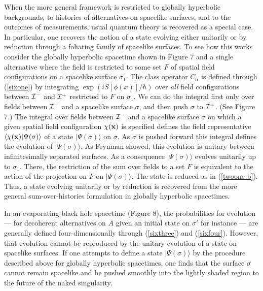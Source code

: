 When the more general framework is restricted to globally hyperbolic
backgrounds, to histories of alternatives on spacelike surfaces, and
to the outcomes of measurements, usual quantum theory is recovered as a special
case.  In particular, one recovers the notion of a state evolving either
unitarily or by reduction through a foliating family of spacelike
surfaces.  To see how this works consider the globally hyperbolic 
spacetime shown in Figure 7 and  a single
alternative where the field is restricted to some set $F$ of spatial
field configurations on a spacelike surface $\sigma_1$. The class
operator $C_\alpha$ is defined through
(\ref{sixone})  by integrating
$\exp(iS [\phi(x)]/\hbar)$ over {\it all} field configurations
between
${\cal I}^-$ and
${\cal I}^+$ restricted to $F$ on $\sigma_1$. We can
do the integral first only over fields between ${\cal I}^-$ and
a spacelike surface
$\sigma$, and then push $\sigma$ to ${\cal I}^+$. (See Figure 7.)
The integral over fields between ${\cal I}^-$ and a spacelike surface
$\sigma$ on which a given spatial field configuration $\chi(\bf x)$ is
specified defines the field representative $\langle \chi({\bf x}) |
\Psi(\sigma) \rangle$ of a state 
$|\Psi(\sigma)\rangle$ on $\sigma$. As $\sigma$ is  pushed forward
this integral defines the evolution of $|\Psi(\sigma)\rangle$. 
As Feynman showed, this evolution is unitary between 
infinitesimally separated surfaces.  As a
consequence $|\Psi(\sigma)\rangle$ evolves unitarily up to $\sigma_1$.
There, the restriction of the sum over fields to a set $F$ is equivalent
to the action of the projection on $F$ on $|\Psi(\sigma)\rangle$. 
The state is reduced as in (\ref{twoone b}).  Thus, a state evolving
unitarily or by reduction is recovered from the more general sum-over-histories
formulation in globally hyperbolic spacetimes. 


In an evaporating black hole spacetime (Figure 8), the probabilities
for evolution --- for decoherent alternatives on $A$ given an initial
state on $\sigma'$ for instance --- are generally defined four-dimensionally
through (\ref{sixthree}) and (\ref{sixfour}). However, that evolution cannot
be reproduced by the unitary
evolution of a state on spacelike surfaces.
If one attempts to define a state 
 $|\Psi(\sigma)\rangle$ by the procedure described above for
globally hyperbolic spacetimes, one finds that the surface $\sigma$
cannot remain spacelike and be pushed smoothly into the lightly shaded 
region to the future of the
naked singularity.  

